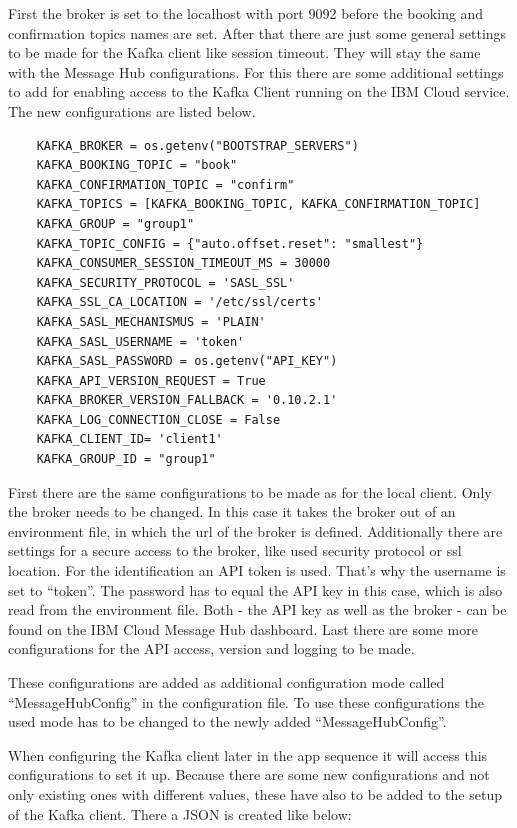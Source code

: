 First the broker is set to the localhost with port 9092 before the booking and confirmation topics names are set. After that there are just some general settings to be made for the Kafka client like session timeout. They will stay the same with the Message Hub configurations. For this there are some additional settings to add for enabling access to the Kafka Client running on the IBM Cloud service. The new configurations are listed below.

\begin{lstlisting}
    KAFKA_BROKER = os.getenv("BOOTSTRAP_SERVERS")
    KAFKA_BOOKING_TOPIC = "book"
    KAFKA_CONFIRMATION_TOPIC = "confirm"
    KAFKA_TOPICS = [KAFKA_BOOKING_TOPIC, KAFKA_CONFIRMATION_TOPIC]
    KAFKA_GROUP = "group1"
    KAFKA_TOPIC_CONFIG = {"auto.offset.reset": "smallest"}
    KAFKA_CONSUMER_SESSION_TIMEOUT_MS = 30000
    KAFKA_SECURITY_PROTOCOL = 'SASL_SSL'
    KAFKA_SSL_CA_LOCATION = '/etc/ssl/certs'
    KAFKA_SASL_MECHANISMUS = 'PLAIN'
    KAFKA_SASL_USERNAME = 'token'
    KAFKA_SASL_PASSWORD = os.getenv("API_KEY")
    KAFKA_API_VERSION_REQUEST = True
    KAFKA_BROKER_VERSION_FALLBACK = '0.10.2.1'
    KAFKA_LOG_CONNECTION_CLOSE = False
    KAFKA_CLIENT_ID= 'client1'
    KAFKA_GROUP_ID = "group1"
\end{lstlisting}

First there are the same configurations to be made as for the local client. Only the broker needs to be changed. In this case it takes the broker out of an environment file, in which the url of the broker is defined. Additionally there are settings for a secure access to the broker, like used security protocol or ssl location. For the identification an API token is used. That's why the username is set to ``token''. The password has to equal the API key in this case, which is also read from the environment file. Both - the API key as well as the broker - can be found on the IBM Cloud Message Hub dashboard. Last there are some more configurations for the API access, version and logging to be made.

These configurations are added as additional configuration mode called ``MessageHubConfig'' in the configuration file. To use these configurations the used mode has to be changed to the newly added ``MessageHubConfig''.

When configuring the Kafka client later in the app sequence it will access this configurations to set it up. Because there are some new configurations and not only existing ones with different values, these have also to be added to the setup of the Kafka client. There a JSON is created like below:

